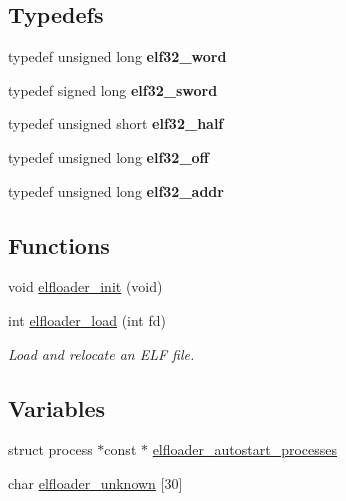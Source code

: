 \subsection*{Typedefs}
\begin{DoxyCompactItemize}
\item 
\hypertarget{group__elfloader_ga14c85b9bd0eeef4214bc87b90d0d3e02}{}typedef unsigned long {\bfseries elf32\+\_\+word}\label{group__elfloader_ga14c85b9bd0eeef4214bc87b90d0d3e02}

\item 
\hypertarget{group__elfloader_ga963fca44d5c29ca9406aa3a0ca40f808}{}typedef signed long {\bfseries elf32\+\_\+sword}\label{group__elfloader_ga963fca44d5c29ca9406aa3a0ca40f808}

\item 
\hypertarget{group__elfloader_ga74d25e010922731c8ec5351be7ee3ca8}{}typedef unsigned short {\bfseries elf32\+\_\+half}\label{group__elfloader_ga74d25e010922731c8ec5351be7ee3ca8}

\item 
\hypertarget{group__elfloader_ga273f7555ac1256eb829dfb274e00f82c}{}typedef unsigned long {\bfseries elf32\+\_\+off}\label{group__elfloader_ga273f7555ac1256eb829dfb274e00f82c}

\item 
\hypertarget{group__elfloader_ga47a5fb7713f48fb20559b4b9c88cfa3a}{}typedef unsigned long {\bfseries elf32\+\_\+addr}\label{group__elfloader_ga47a5fb7713f48fb20559b4b9c88cfa3a}

\end{DoxyCompactItemize}
\subsection*{Functions}
\begin{DoxyCompactItemize}
\item 
void \hyperlink{group__elfloader_gacfa73525b05c5a176aa1017b071340a4}{elfloader\+\_\+init} (void)
\item 
int \hyperlink{group__elfloader_ga57190d49fcc860d9a780f2860e896a5b}{elfloader\+\_\+load} (int fd)
\begin{DoxyCompactList}\small\item\em Load and relocate an E\+L\+F file. \end{DoxyCompactList}\end{DoxyCompactItemize}
\subsection*{Variables}
\begin{DoxyCompactItemize}
\item 
struct process $\ast$const $\ast$ \hyperlink{group__elfloader_ga9f2016bded2b94bde0fd29bf260aecd1}{elfloader\+\_\+autostart\+\_\+processes}
\item 
char \hyperlink{group__elfloader_gaf087e757d08d26af687c22380a039d75}{elfloader\+\_\+unknown} \mbox{[}30\mbox{]}
\end{DoxyCompactItemize}


